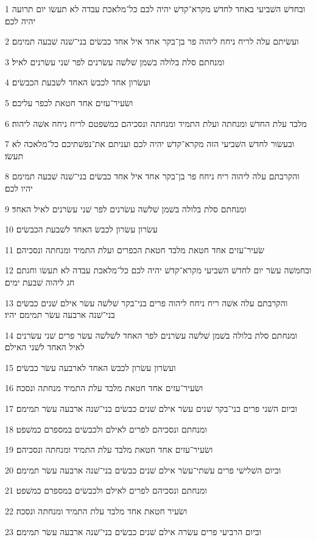 \par 1 ובחדשׁ השׁביעי באחד לחדשׁ מקרא־קדשׁ יהיה לכם כל־מלאכת עבדה לא תעשׂו יום תרועה יהיה לכם׃
\par 2 ועשׂיתם עלה לריח ניחח ליהוה פר בן־בקר אחד איל אחד כבשׂים בני־שׁנה שׁבעה תמימם׃
\par 3 ומנחתם סלת בלולה בשׁמן שׁלשׁה עשׂרנים לפר שׁני עשׂרנים לאיל׃
\par 4 ועשׂרון אחד לכבשׂ האחד לשׁבעת הכבשׂים׃
\par 5 ושׂעיר־עזים אחד חטאת לכפר עליכם׃
\par 6 מלבד עלת החדשׁ ומנחתה ועלת התמיד ומנחתה ונסכיהם כמשׁפטם לריח ניחח אשׁה ליהוה׃
\par 7 ובעשׂור לחדשׁ השׁביעי הזה מקרא־קדשׁ יהיה לכם ועניתם את־נפשׁתיכם כל־מלאכה לא תעשׂו׃
\par 8 והקרבתם עלה ליהוה ריח ניחח פר בן־בקר אחד איל אחד כבשׂים בני־שׁנה שׁבעה תמימם יהיו לכם׃
\par 9 ומנחתם סלת בלולה בשׁמן שׁלשׁה עשׂרנים לפר שׁני עשׂרנים לאיל האחד׃
\par 10 עשׂרון עשׂרון לכבשׂ האחד לשׁבעת הכבשׂים׃
\par 11 שׂעיר־עזים אחד חטאת מלבד חטאת הכפרים ועלת התמיד ומנחתה ונסכיהם׃
\par 12 ובחמשׁה עשׂר יום לחדשׁ השׁביעי מקרא־קדשׁ יהיה לכם כל־מלאכת עבדה לא תעשׂו וחגתם חג ליהוה שׁבעת ימים׃
\par 13 והקרבתם עלה אשׁה ריח ניחח ליהוה פרים בני־בקר שׁלשׁה עשׂר אילם שׁנים כבשׂים בני־שׁנה ארבעה עשׂר תמימם יהיו׃
\par 14 ומנחתם סלת בלולה בשׁמן שׁלשׁה עשׂרנים לפר האחד לשׁלשׁה עשׂר פרים שׁני עשׂרנים לאיל האחד לשׁני האילם׃
\par 15 ועשׂרון עשׂרון לכבשׂ האחד לארבעה עשׂר כבשׂים׃
\par 16 ושׂעיר־עזים אחד חטאת מלבד עלת התמיד מנחתה ונסכה׃
\par 17 וביום השׁני פרים בני־בקר שׁנים עשׂר אילם שׁנים כבשׂים בני־שׁנה ארבעה עשׂר תמימם׃
\par 18 ומנחתם ונסכיהם לפרים לאילם ולכבשׂים במספרם כמשׁפט׃
\par 19 ושׂעיר־עזים אחד חטאת מלבד עלת התמיד ומנחתה ונסכיהם׃
\par 20 וביום השׁלישׁי פרים עשׁתי־עשׂר אילם שׁנים כבשׂים בני־שׁנה ארבעה עשׂר תמימם׃
\par 21 ומנחתם ונסכיהם לפרים לאילם ולכבשׂים במספרם כמשׁפט׃
\par 22 ושׂעיר חטאת אחד מלבד עלת התמיד ומנחתה ונסכה׃
\par 23 וביום הרביעי פרים עשׂרה אילם שׁנים כבשׂים בני־שׁנה ארבעה עשׂר תמימם׃
